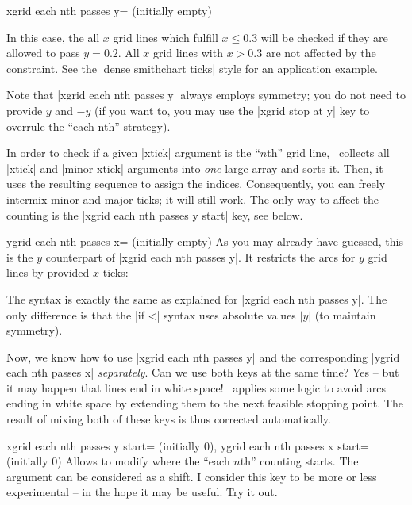 \begin{pgfplotskey}{xgrid each nth passes y= (initially empty)}
\begin{enumerate}
		In this case, the all $x$ grid lines which fulfill $x \le 0.3$ will be checked if they are allowed to pass $y=0.2$. All $x$ grid lines with $x > 0.3$ are not affected by the constraint. See the |dense smithchart ticks| style for an application example.
	\end{enumerate}

	Note that |xgrid each nth passes y| always employs symmetry; you do not need to provide $y$ and $-y$ (if you want to, you may use the |xgrid stop at y| key to overrule the ``each nth''-strategy).


	In order to check if a given |xtick| argument is the ``$n$th'' grid line, \PGFPlots\ collects all |xtick| and |minor xtick| arguments into \emph{one} large array and sorts it. Then, it uses the resulting sequence to assign the indices. Consequently, you can freely intermix minor and major ticks; it will still work. The only way to affect the counting is the |xgrid each nth passes y start| key, see below.
\end{pgfplotskey}

\begin{pgfplotskey}{ygrid each nth passes x= (initially empty)}
	As you may already have guessed, this is the $y$ counterpart of |xgrid each nth passes y|. It restricts the arcs for $y$ grid lines by provided $x$ ticks:
\begin{codeexample}[]
\begin{tikzpicture}
	\begin{smithchart}[
		xtick={0.2,0.5,1,2,5},
		ytick={
			0,
			 0.2, 0.5, 1, 2, 5,
			-0.2,-0.5,-1,-2,-5},
		ygrid each nth passes x={0.2,1:2},
	]
	\end{smithchart}
\end{tikzpicture}
\end{codeexample}
	The syntax is exactly the same as explained for |xgrid each nth passes y|. The only difference is that the |if <| syntax uses absolute values $|y|$ (to maintain symmetry).
\end{pgfplotskey}

Now, we know how to use |xgrid each nth passes y| and the corresponding |ygrid each nth passes x| \emph{separately}. Can we use both keys at the same time? Yes -- but it may happen that lines end in white space! \PGFPlots\ applies some logic to avoid arcs ending in white space by extending them to the next feasible stopping point. The result of mixing both of these keys is thus corrected automatically.

\begin{pgfplotskeylist}{%
	xgrid each nth passes y start= (initially 0),%
	ygrid each nth passes x start= (initially 0)}
	Allows to modify where the ``each $n$th'' counting starts. The argument can be considered as a shift. I consider this key to be more or less experimental -- in the hope it may be useful. Try it out.
\end{pgfplotskeylist}

